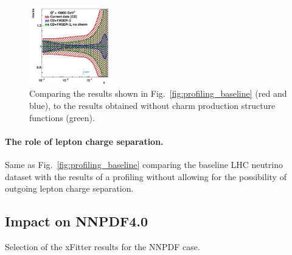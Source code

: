 \begin{figure}[t]
\includegraphics[width=0.32\textwidth]{plots/proton_fasernu2/inclusive-only_vs_inclusive+charm/statOnly_FASERv2_q2_10000_pdf_s_ratio.pdf}
\caption{Comparing the results shown in Fig.~\ref{fig:profiling_baseline} (red and blue), 
to the results obtained without charm production structure functions (green).
}
\label{fig:profiling_charm}
\end{figure}

\paragraph{The role of lepton charge separation.}
%
Same as Fig.~\ref{fig:profiling_baseline} comparing the baseline LHC neutrino dataset with the results
of a profiling without allowing for the possibility of outgoing lepton charge separation.



\subsection{Impact on NNPDF4.0}
\label{sec:nnpdf40}

Selection of the {\sc\small xFitter} results for the NNPDF case.
